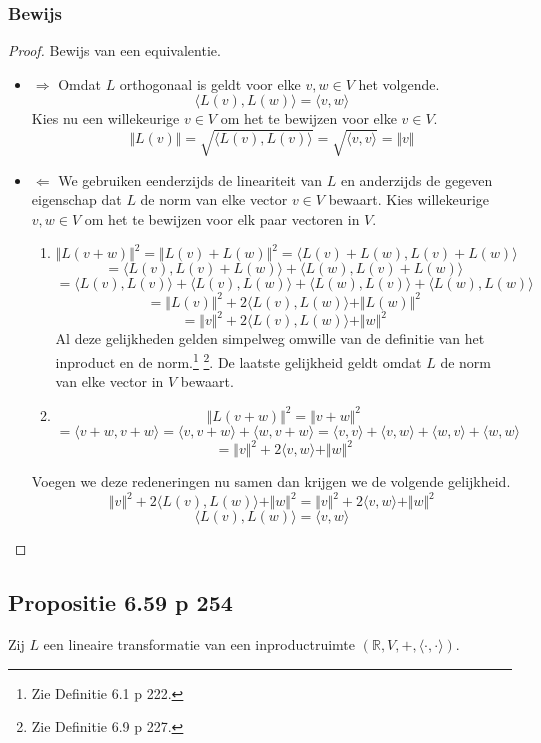 \documentclass[lineaire_algebra_oplossingen.tex]{subfiles}
\begin{document}
\subsubsection*{Bewijs}
\begin{proof}
Bewijs van een equivalentie.\\
\begin{itemize}
\item $\Rightarrow$
Omdat $L$ orthogonaal is geldt voor elke $v,w \in V$ het volgende.
\[
\langle L(v), L(w) \rangle = \langle v,w\rangle
\]
Kies nu een willekeurige $v \in V$ om het te bewijzen voor elke $v\in V$.
\[
\Vert L(v) \Vert = \sqrt{\langle L(v), L(v) \rangle} = \sqrt{\langle v, v \rangle} = \Vert v\Vert
\]

\item $\Leftarrow$
We gebruiken eenderzijds de lineariteit van $L$ en anderzijds de gegeven eigenschap dat $L$ de norm van elke vector $v \in V$ bewaart. Kies willekeurige $v,w \in V$ om het te bewijzen voor elk paar vectoren in $V$.
\begin{enumerate}
\item
\[
\Vert L(v+w) \Vert^2 = \Vert L(v)+L(w) \Vert^2 = \langle L(v)+L(w),L(v)+L(w) \rangle
\]
\[
= \langle L(v),L(v)+L(w) \rangle + \langle L(w),L(v)+L(w) \rangle
\]
\[
= \langle L(v),L(v) \rangle + \langle L(v),L(w) \rangle + \langle L(w),L(v) \rangle +\langle L(w),L(w) \rangle
\]
\[
= \Vert L(v)\Vert^2 + 2\langle L(v),L(w) \rangle +\Vert L(w)\Vert^2
\]
\[
= \Vert v\Vert^2 + 2\langle L(v),L(w) \rangle +\Vert w\Vert^2
\]
Al deze gelijkheden gelden simpelweg omwille van de definitie van het inproduct en de norm.\footnote{Zie Definitie 6.1 p 222.} \footnote{Zie Definitie 6.9 p 227.}. De laatste gelijkheid geldt omdat $L$ de norm van elke vector in $V$ bewaart.
\item
\[
\Vert L(v+w) \Vert^2 = \Vert v+w \Vert^2
\]
\[
= \langle v+w,v+w\rangle = \langle v,v+w\rangle + \langle w,v+w\rangle = \langle v,v\rangle + \langle v,w\rangle + \langle w,v\rangle + \langle w,w\rangle
\]
\[
= \Vert v\Vert^2 + 2\langle v,w \rangle +\Vert w\Vert^2
\]
\end{enumerate}
Voegen we deze redeneringen nu samen dan krijgen we de volgende gelijkheid.
\[
\Vert v\Vert^2 + 2\langle L(v),L(w) \rangle +\Vert w\Vert^2 = \Vert v\Vert^2 + 2\langle v,w \rangle +\Vert w\Vert^2
\]
\[
\langle L(v),L(w) \rangle =\langle v,w \rangle
\]
\end{itemize}
\end{proof}

\subsection{Propositie 6.59 p 254}
Zij $L$ een lineaire transformatie van een inproductruimte $(\mathbb{R},V,+,\langle \cdot,\cdot \rangle)$.
\end{document}
